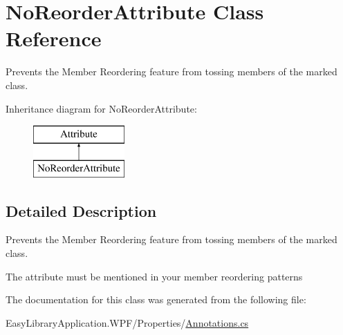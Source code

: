 \hypertarget{class_no_reorder_attribute}{}\section{No\+Reorder\+Attribute Class Reference}
\label{class_no_reorder_attribute}


Prevents the Member Reordering feature from tossing members of the marked class.  


Inheritance diagram for No\+Reorder\+Attribute\+:\begin{figure}[H]
\begin{center}
\leavevmode
\includegraphics[height=2.000000cm]{class_no_reorder_attribute}
\end{center}
\end{figure}


\subsection{Detailed Description}
Prevents the Member Reordering feature from tossing members of the marked class. 

The attribute must be mentioned in your member reordering patterns 

The documentation for this class was generated from the following file\+:\begin{DoxyCompactItemize}
\item 
Easy\+Library\+Application.\+W\+P\+F/\+Properties/\mbox{\hyperlink{_annotations_8cs}{Annotations.\+cs}}\end{DoxyCompactItemize}
